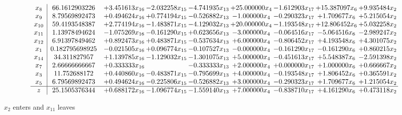 \documentclass[10pt]{article}
\begin{document}
 \[\begin{array}{c| c c@{\hskip 2pt} c@{\hskip 2pt} c@{\hskip 2pt} c@{\hskip 2pt} c@{\hskip 2pt} c@{\hskip 2pt} c@{\hskip 2pt} }
 x_{8}   &  66.1612903226 & + 3.451613 x_{16} & -2.032258 x_{15} & -4.741935 x_{13} & + 25.000000 x_{4} & -1.612903 x_{17} & + 15.387097 x_{6} & + 9.935484 x_{2}\\
 x_{9}   &  8.79569892473 & + 0.494624 x_{16} & + 0.774194 x_{15} & -0.526882 x_{13} & -1.000000 x_{4} & -0.290323 x_{17} & + 1.709677 x_{6} & + 5.215054 x_{2}\\
 x_{10}   &  59.4193548387 & + 2.774194 x_{16} & -1.483871 x_{15} & -4.129032 x_{13} & + 20.000000 x_{4} & -1.193548 x_{17} & + 12.806452 x_{6} & + 5.032258 x_{2}\\
 x_{11}   &  1.13978494624 & -1.075269 x_{16} & -0.161290 x_{15} & + 0.623656 x_{13} & -3.000000 x_{4} & -0.064516 x_{17} & -5.064516 x_{6} & -2.989247 x_{2}\\
 x_{12}   &  6.91397849462 & + 0.892473 x_{16} & + 0.483871 x_{15} & -0.537634 x_{13} & + 6.000000 x_{4} & -0.806452 x_{17} & + 4.193548 x_{6} & + 4.301075 x_{2}\\
 x_{1}   &  0.182795698925 & -0.021505 x_{16} & + 0.096774 x_{15} & -0.107527 x_{13} & -0.000000 x_{4} & -0.161290 x_{17} & -0.161290 x_{6} & + 0.860215 x_{2}\\
 x_{14}   &  34.311827957 & + 1.139785 x_{16} & -1.129032 x_{15} & -1.301075 x_{13} & + 5.000000 x_{4} & -0.451613 x_{17} & + 5.548387 x_{6} & -2.591398 x_{2}\\
 x_{7}   &  2.66666666667 & + 0.333333 x_{16} &   & -0.333333 x_{13} & + 2.000000 x_{4} & + 0.000000 x_{17} & + 1.000000 x_{6} & + 0.666667 x_{2}\\
 x_{3}   &  11.752688172 & + 0.440860 x_{16} & -0.483871 x_{15} & -0.795699 x_{13} & + 4.000000 x_{4} & -0.193548 x_{17} & + 1.806452 x_{6} & + 0.365591 x_{2}\\
 x_{5}   &  6.79569892473 & + 0.494624 x_{16} & -0.225806 x_{15} & -0.526882 x_{13} & + 3.000000 x_{4} & -0.290323 x_{17} & + 1.709677 x_{6} & + 1.215054 x_{2}\\
\hline
z    &  25.1505376344 & + 0.688172 x_{16} & -1.096774 x_{15} & -1.559140 x_{13} & + 7.000000 x_{4} & -0.838710 x_{17} & + 4.161290 x_{6} & + 0.473118 x_{2}\\
\end{array}\]


 $ x_{2} $ enters and $ x_{11} $ leaves 
\end{document}
